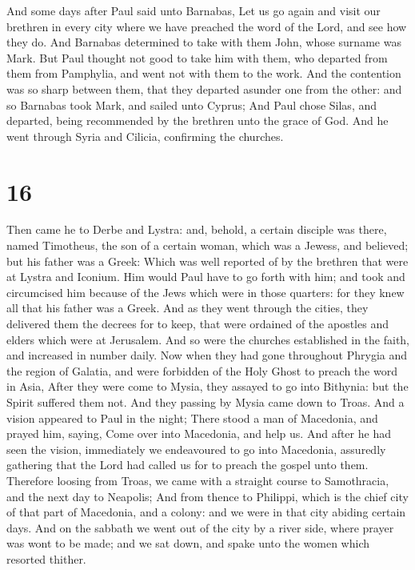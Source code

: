  And some days after Paul said unto Barnabas, Let us go
again and visit our brethren in every city where we have preached the
word of the Lord, and see how they do.  And Barnabas
determined to take with them John, whose surname was Mark.
 But Paul thought not good to take him with them, who
departed from them from Pamphylia, and went not with them to the work.
 And the contention was so sharp between them, that they
departed asunder one from the other: and so Barnabas took Mark, and
sailed unto Cyprus;  And Paul chose Silas, and departed,
being recommended by the brethren unto the grace of God. 
And he went through Syria and Cilicia, confirming the churches.

\hypertarget{section-15}{%
\section{16}\label{section-15}}

 Then came he to Derbe and Lystra: and, behold, a certain
disciple was there, named Timotheus, the son of a certain woman, which
was a Jewess, and believed; but his father was a Greek: 
Which was well reported of by the brethren that were at Lystra and
Iconium.  Him would Paul have to go forth with him; and
took and circumcised him because of the Jews which were in those
quarters: for they knew all that his father was a Greek. 
And as they went through the cities, they delivered them the decrees for
to keep, that were ordained of the apostles and elders which were at
Jerusalem.  And so were the churches established in the
faith, and increased in number daily.  Now when they had
gone throughout Phrygia and the region of Galatia, and were forbidden of
the Holy Ghost to preach the word in Asia,  After they
were come to Mysia, they assayed to go into Bithynia: but the Spirit
suffered them not.  And they passing by Mysia came down to
Troas.  And a vision appeared to Paul in the night; There
stood a man of Macedonia, and prayed him, saying, Come over into
Macedonia, and help us.  And after he had seen the
vision, immediately we endeavoured to go into Macedonia, assuredly
gathering that the Lord had called us for to preach the gospel unto
them.  Therefore loosing from Troas, we came with a
straight course to Samothracia, and the next day to Neapolis;
 And from thence to Philippi, which is the chief city of
that part of Macedonia, and a colony: and we were in that city abiding
certain days.  And on the sabbath we went out of the city
by a river side, where prayer was wont to be made; and we sat down, and
spake unto the women which resorted thither.

